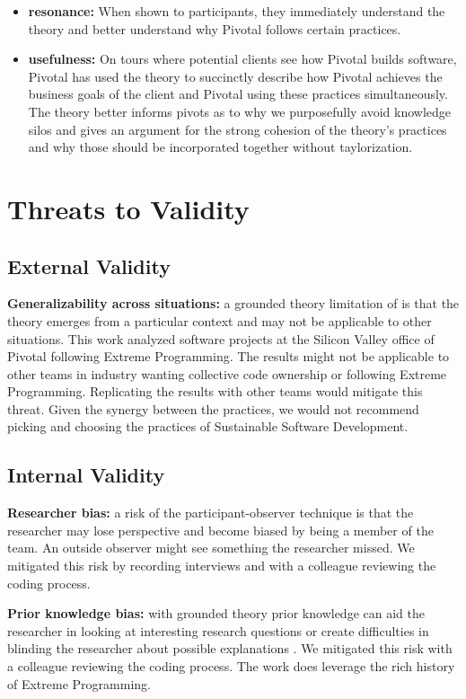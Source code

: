 \begin{table}[]
\begin{itemize}
\item
\textbf{resonance:} When shown to participants, they immediately understand the theory and better understand why Pivotal follows certain practices. 

\item
\textbf{usefulness:} 
On tours where potential clients see how Pivotal builds software, Pivotal has used the theory to succinctly describe how Pivotal achieves the business goals of the client and Pivotal using these practices simultaneously. The theory better informs pivots as to why we purposefully avoid knowledge silos and gives an argument for the strong cohesion of the theory's practices and why those should be incorporated together without taylorization. 
\end{itemize}

\section{Threats to Validity}

\subsection{External Validity}

\textbf{Generalizability across situations:} a grounded theory limitation of  is that the theory emerges from a particular context and may not be applicable to other situations. This work analyzed software projects at the Silicon Valley office of Pivotal following Extreme Programming. The results might not be applicable to other teams in industry wanting collective code ownership or  following Extreme Programming. Replicating the results with other teams would mitigate this threat. Given the synergy between the practices, we would not recommend picking and choosing the practices of Sustainable Software Development.

\subsection{Internal Validity}
\textbf{Researcher bias:} a risk of the participant-observer technique is that the researcher may lose perspective and become biased by being a member of the team. An outside observer might see something the researcher missed. We mitigated this risk by recording interviews and with a colleague reviewing the coding process.

\textbf{Prior knowledge bias:} with grounded theory prior knowledge can aid the researcher in looking at interesting research questions or create difficulties in blinding the researcher about possible explanations \cite{GlaserIssues}. We mitigated this risk with a colleague reviewing the coding process. The work does leverage the rich history of Extreme Programming.


\end{table}
